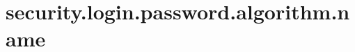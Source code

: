 \section{security.login.password.algorithm.name}
\label{configuration:SecurityLoginPasswordAlgorithmName}
\AvailableInJavaOnly{\TODO}